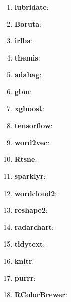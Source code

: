 \begin{enumerate}
    \item \textbf{lubridate}:
    \item \textbf{Boruta}:
    \item \textbf{irlba}:
    \item \textbf{themis}:
    \item \textbf{adabag}:
    \item \textbf{gbm}:
    \item \textbf{xgboost}:
    \item \textbf{tensorflow}:
    \item \textbf{word2vec}:
    \item \textbf{Rtsne}:
    \item \textbf{sparklyr}:
    \item \textbf{wordcloud2}:
    \item \textbf{reshape2}:
    \item \textbf{radarchart}:
    \item \textbf{tidytext}:
    \item \textbf{knitr}:
    \item \textbf{purrr}:
    \item \textbf{RColorBrewer}:
    
\end{enumerate}

\newpage